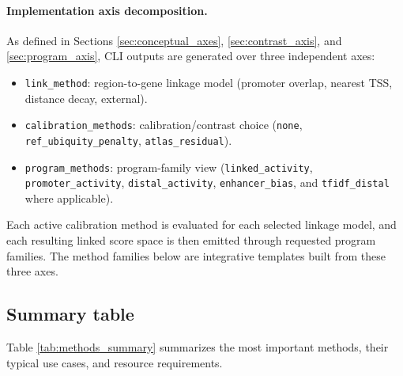\documentclass[11pt]{article}
\begin{document}
\paragraph{Implementation axis decomposition.}
As defined in Sections \ref{sec:conceptual_axes}, \ref{sec:contrast_axis}, and \ref{sec:program_axis}, CLI outputs are generated over three independent axes:
\begin{itemize}[leftmargin=2em]
\item \texttt{link\_method}: region-to-gene linkage model (promoter overlap, nearest TSS, distance decay, external).
\item \texttt{calibration\_methods}: calibration/contrast choice (\texttt{none}, \texttt{ref\_ubiquity\_penalty}, \texttt{atlas\_residual}).
\item \texttt{program\_methods}: program-family view (\texttt{linked\_activity}, \texttt{promoter\_activity}, \texttt{distal\_activity}, \texttt{enhancer\_bias}, and \texttt{tfidf\_distal} where applicable).
\end{itemize}
Each active calibration method is evaluated for each selected linkage model, and each resulting linked score space is then emitted through requested program families.
The method families below are integrative templates built from these three axes.

\subsection{Summary table}
Table \ref{tab:methods_summary} summarizes the most important methods, their typical use cases, and resource requirements.
\end{document}
